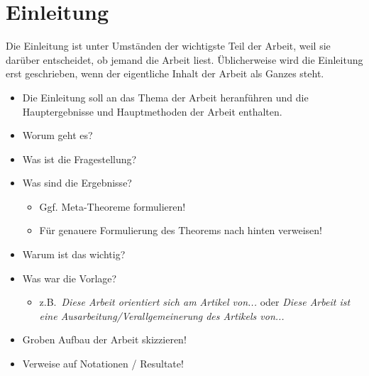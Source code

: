 \documentclass[a4paper,11pt,bibliography=totoc,listof=totoc,headinclude=true,cleardoublepage=empty,oneside]{scrbook}
\begin{document}
\chapter{Einleitung}
\label{chapter:introduction}

{\color{change}

\noindent
Die Einleitung ist unter Umständen der wichtigste Teil der Arbeit, weil sie darüber entscheidet, ob jemand die Arbeit liest. Üblicherweise wird die Einleitung erst geschrieben, wenn der eigentliche Inhalt der Arbeit als Ganzes steht.

\begin{itemize}

\item Die Einleitung soll an das Thema der Arbeit heranführen und die Hauptergebnisse und Hauptmethoden der Arbeit enthalten. 

\item Worum geht es?
\item Was ist die Fragestellung?

\item Was sind die Ergebnisse?
\begin{itemize}
\item Ggf. Meta-Theoreme formulieren!
\item Für genauere Formulierung des Theorems nach hinten verweisen!
\end{itemize}

\item Warum ist das wichtig?

\item Was war die Vorlage?
\begin{itemize}
\item z.B.\ \emph{Diese Arbeit orientiert sich am Artikel von...} oder \emph{Diese Arbeit
ist eine Ausarbeitung/Verallgemeinerung des Artikels von...}
\end{itemize}

\item Groben Aufbau der Arbeit skizzieren!

\item Verweise auf Notationen / Resultate!

\end{itemize}
}
\end{document}
